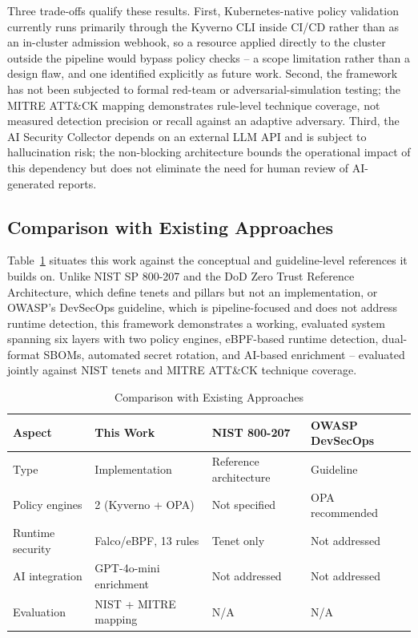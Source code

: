 \documentclass[conference]{IEEEtran}
\begin{document}
Three trade-offs qualify these results. First, Kubernetes-native policy validation currently runs primarily through the Kyverno CLI inside CI/CD rather than as an in-cluster admission webhook, so a resource applied directly to the cluster outside the pipeline would bypass policy checks -- a scope limitation rather than a design flaw, and one identified explicitly as future work. Second, the framework has not been subjected to formal red-team or adversarial-simulation testing; the MITRE ATT\&CK mapping demonstrates rule-level technique coverage, not measured detection precision or recall against an adaptive adversary. Third, the AI Security Collector depends on an external LLM API and is subject to hallucination risk; the non-blocking architecture bounds the operational impact of this dependency but does not eliminate the need for human review of AI-generated reports.

\subsection{Comparison with Existing Approaches}
Table~\ref{tab:comparison} situates this work against the conceptual and guideline-level references it builds on. Unlike NIST SP 800-207 and the DoD Zero Trust Reference Architecture, which define tenets and pillars but not an implementation, or OWASP's DevSecOps guideline, which is pipeline-focused and does not address runtime detection, this framework demonstrates a working, evaluated system spanning six layers with two policy engines, eBPF-based runtime detection, dual-format SBOMs, automated secret rotation, and AI-based enrichment -- evaluated jointly against NIST tenets and MITRE ATT\&CK technique coverage.

\begin{table}[!t]
\caption{Comparison with Existing Approaches}
\label{tab:comparison}
\centering
\footnotesize
\begin{tabular}{@{}p{1.6cm}p{1.5cm}p{1.5cm}p{1.4cm}@{}}
\toprule
\textbf{Aspect} & \textbf{This Work} & \textbf{NIST 800-207 \cite{rose2020}} & \textbf{OWASP DevSecOps \cite{owasp2023}} \\
\midrule
Type & Implementation & Reference architecture & Guideline \\
Policy engines & 2 (Kyverno + OPA) & Not specified & OPA recommended \\
Runtime security & Falco/eBPF, 13 rules & Tenet only & Not addressed \\
AI integration & GPT-4o-mini enrichment & Not addressed & Not addressed \\
Evaluation & NIST + MITRE mapping & N/A & N/A \\
\bottomrule
\end{tabular}
\end{table}
\end{document}
